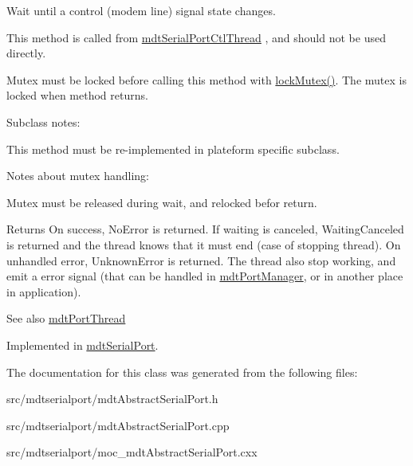 Wait until a control (modem line) signal state changes. 

This method is called from \hyperlink{classmdt_serial_port_ctl_thread}{mdtSerialPortCtlThread} , and should not be used directly.\par
 Mutex must be locked before calling this method with \hyperlink{classmdt_abstract_port_a6bf2ecdcf894da3929a22eb8793a9fe3}{lockMutex()}. The mutex is locked when method returns.

Subclass notes:\par
 This method must be re-\/implemented in plateform specific subclass.\par
 Notes about mutex handling:
\begin{DoxyItemize}
\item Mutex must be released during wait, and relocked befor return.
\end{DoxyItemize}

\begin{DoxyReturn}{Returns}
On success, NoError is returned. If waiting is canceled, WaitingCanceled is returned and the thread knows that it must end (case of stopping thread). On unhandled error, UnknownError is returned. The thread also stop working, and emit a error signal (that can be handled in \hyperlink{classmdt_port_manager}{mdtPortManager}, or in another place in application).
\end{DoxyReturn}
\begin{DoxySeeAlso}{See also}
\hyperlink{classmdt_port_thread}{mdtPortThread} 
\end{DoxySeeAlso}


Implemented in \hyperlink{classmdt_serial_port_a9d1402c229401343a3bf66eeda4fe9da}{mdtSerialPort}.



The documentation for this class was generated from the following files:\begin{DoxyCompactItemize}
\item 
src/mdtserialport/mdtAbstractSerialPort.h\item 
src/mdtserialport/mdtAbstractSerialPort.cpp\item 
src/mdtserialport/moc\_\-mdtAbstractSerialPort.cxx\end{DoxyCompactItemize}
